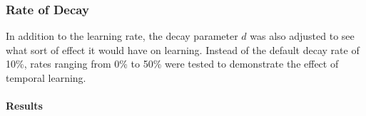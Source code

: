 
\subsubsection*{Rate of Decay}
\label{sec:findings-expts-decay}

In addition to the learning rate,
the decay parameter $d$ was also adjusted to see what sort of effect it
would have on learning.
%
Instead of the default decay rate of 10\%,
rates ranging from 0\% to 50\%
were tested to demonstrate the effect of temporal learning.

\paragraph*{Results}




